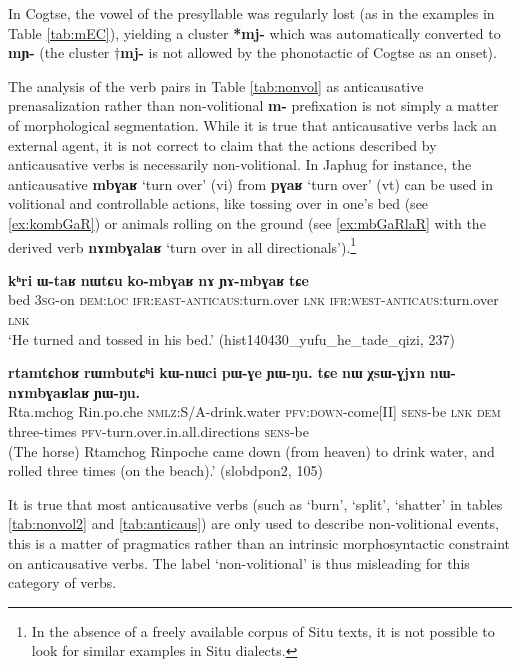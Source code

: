 \documentclass[oneside,a4paper,11pt]{article}
\newcommand{\ipa}[1]{\textbf{{\phon\mbox{#1}}}} %
\begin{document}
In Cogtse, the vowel of the presyllable was regularly lost (as in the examples in Table \ref{tab:mEC}), yielding a cluster \ipa{*mj-} which was automatically converted to \ipa{mɲ-} (the cluster $\dagger$\ipa{mj-} is not allowed by the phonotactic of Cogtse as an onset).

The analysis of the verb pairs in Table \ref{tab:nonvol} as anticausative prenasalization rather than non-volitional \ipa{m-} prefixation is not simply a matter of morphological segmentation. While it is true that anticausative verbs lack an external agent, it is not correct to claim that the actions described by anticausative verbs is necessarily non-volitional. In Japhug for instance, the anticausative \ipa{mbɣaʁ} `turn over' (vi) from \ipa{pɣaʁ} `turn over' (vt) can be used in volitional and controllable actions, like tossing over in one's bed (see \ref{ex:kombGaR}) or animals rolling on the ground (see \ref{ex:mbGaRlaR} with  the derived verb \ipa{nɤmbɣalaʁ} `turn over in all directionals').\footnote{In the absence of a freely available corpus of Situ texts, it is not possible to look for similar examples in Situ dialects.}

 \begin{exe}
\ex \label{ex:kombGaR}
\gll \ipa{kʰri} 	\ipa{ɯ-taʁ} 	\ipa{nɯtɕu} 	\ipa{ko-mbɣaʁ} 	\ipa{nɤ} 	\ipa{ɲɤ-mbɣaʁ} 	\ipa{tɕe}  \\
bed \textsc{3sg}-on \textsc{dem:loc} \textsc{ifr:east-anticaus}:turn.over \textsc{lnk} \textsc{ifr:west-anticaus}:turn.over \textsc{lnk} \\
\glt `He turned and tossed in his bed.' (hist140430_yufu_he_tade_qizi, 237)
\end{exe}

 \begin{exe}
\ex \label{ex:mbGaRlaR}
\gll \ipa{rtamtɕhoʁ} 	\ipa{rɯmbutɕʰi} 	\ipa{kɯ-nɯci} 	\ipa{pɯ-ɣe} 	\ipa{ɲɯ-ŋu.} \ipa{tɕe} 	\ipa{nɯ} 	\ipa{χsɯ-ɣjɤn} 	\ipa{nɯ-nɤmbɣaʁlaʁ} 	\ipa{ɲɯ-ŋu.}  \\
 Rta.mchog Rin.po.che \textsc{nmlz}:S/A-drink.water \textsc{pfv:down}-come[II]  \textsc{sens}-be \textsc{lnk} \textsc{dem} three-times \textsc{pfv}-turn.over.in.all.directions  \textsc{sens}-be \\
\glt  (The horse) Rtamchog Rinpoche came down (from heaven) to drink water, and rolled three times (on the beach).' (slobdpon2, 105)
 \end{exe}

It is true that most anticausative verbs (such as `burn', `split', `shatter' in tables \ref{tab:nonvol2} and \ref{tab:anticaus}) are only used to describe non-volitional events, this is a matter of pragmatics rather than an intrinsic morphosyntactic constraint on anticausative verbs. The label `non-volitional' is thus misleading for this category of verbs.
\end{document}
